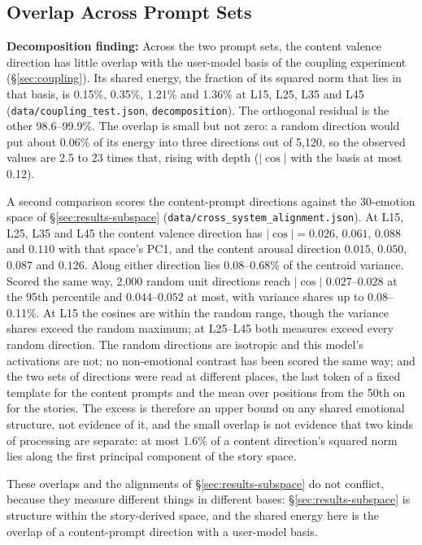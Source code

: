 \documentclass[11pt,a4paper]{article}
\begin{document}
\subsection{Overlap Across Prompt Sets}
\label{sec:results-overlap}

\textbf{Decomposition finding:} Across the two prompt sets, the content valence direction has little overlap with the user-model basis of the coupling experiment (\S\ref{sec:coupling}). Its shared energy, the fraction of its squared norm that lies in that basis, is 0.15\%, 0.35\%, 1.21\% and 1.36\% at L15, L25, L35 and L45 (\texttt{data/\allowbreak coupling\_test.json}, \texttt{decomposition}). The orthogonal residual is the other 98.6--99.9\%. The overlap is small but not zero: a random direction would put about 0.06\% of its energy into three directions out of 5,120, so the observed values are 2.5 to 23 times that, rising with depth ($|\cos|$ with the basis at most 0.12).

A second comparison scores the content-prompt directions against the 30-emotion space of \S\ref{sec:results-subspace} (\texttt{data/\allowbreak cross\_system\_alignment.json}). At L15, L25, L35 and L45 the content valence direction has $|\cos| = 0.026$, $0.061$, $0.088$ and $0.110$ with that space's PC1, and the content arousal direction $0.015$, $0.050$, $0.087$ and $0.126$. Along either direction lies 0.08--0.68\% of the centroid variance. Scored the same way, 2,000 random unit directions reach $|\cos|$ $0.027$--$0.028$ at the 95th percentile and $0.044$--$0.052$ at most, with variance shares up to 0.08--0.11\%. At L15 the cosines are within the random range, though the variance shares exceed the random maximum; at L25--L45 both measures exceed every random direction. The random directions are isotropic and this model's activations are not; no non-emotional contrast has been scored the same way; and the two sets of directions were read at different places, the last token of a fixed template for the content prompts and the mean over positions from the 50th on for the stories. The excess is therefore an upper bound on any shared emotional structure, not evidence of it, and the small overlap is not evidence that two kinds of processing are separate: at most 1.6\% of a content direction's squared norm lies along the first principal component of the story space.

These overlaps and the alignments of \S\ref{sec:results-subspace} do not conflict, because they measure different things in different bases: \S\ref{sec:results-subspace} is structure within the story-derived space, and the shared energy here is the overlap of a content-prompt direction with a user-model basis.
\end{document}
